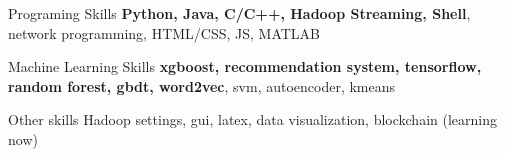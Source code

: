 
\begin{cvskills}
  \cvskill
    {Programing Skills} %
    {\textbf{Python, Java, C/C++, Hadoop Streaming, Shell}, network programming, HTML/CSS, JS, MATLAB} %

  \cvskill
    {Machine Learning Skills} %
    {\textbf{xgboost, recommendation system, tensorflow, random forest, gbdt, word2vec}, svm, autoencoder, kmeans} %

  \cvskill
    {Other skills}
    {Hadoop settings, gui, latex, data visualization, blockchain (learning now)}
\end{cvskills}
